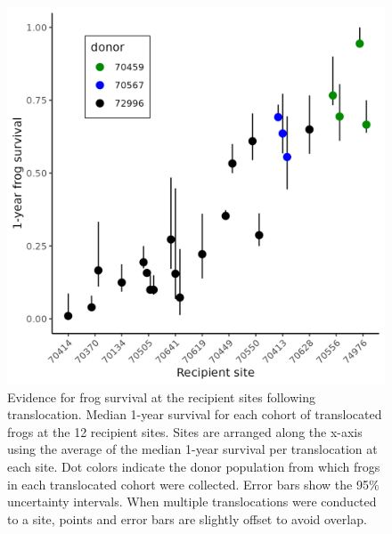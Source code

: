 \documentclass[9pt,twocolumn,twoside,lineno]{pnas-new}
\begin{document}
\begin{figure}

{\centering \includegraphics[width=\textwidth]{figures/translocation_survival_bysiteid.png}

}

\caption{\label{fig-translocation-survival}Evidence for frog survival at
the recipient sites following translocation. Median 1-year survival for
each cohort of translocated frogs at the 12 recipient sites. Sites are
arranged along the x-axis using the average of the median 1-year
survival per translocation at each site. Dot colors indicate the donor
population from which frogs in each translocated cohort were collected.
Error bars show the 95\% uncertainty intervals. When multiple
translocations were conducted to a site, points and error bars are
slightly offset to avoid overlap.}

\end{figure}

\newpage
\end{document}

